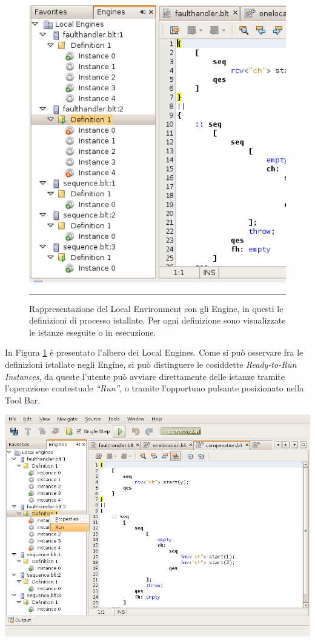 \begin{figure}[t]
\begin{center}
\includegraphics[scale=0.65]
{blide/dia/BlideEngines}
\caption[Blide, feedback alla compilazione]{Rappresentazione del Local
Environment con gli Engine, in questi le definizioni di processo istallate. Per
ogni definizione sono visualizzate le istanze eseguite o in esecuzione.}
\rule{7cm}{0.01cm}
  \label{fig:blidEngines}
\end{center}
\end{figure}

In Figura \ref{fig:blidEngines} è presentato l'albero dei Local Engines.
Come si può osservare fra le definizioni istallate negli Engine, si può
distinguere le cosiddette \emph{Ready-to-Run Instances}, da queste l'utente
può avviare direttamente delle istanze tramite l'operazione contestuale
\emph{``Run''}, o tramite l'opportuno pulsante posizionato nella Tool Bar.

\begin{center}
\includegraphics[scale=0.65]{blide/dia/BlideRunInst}
\end{center}

